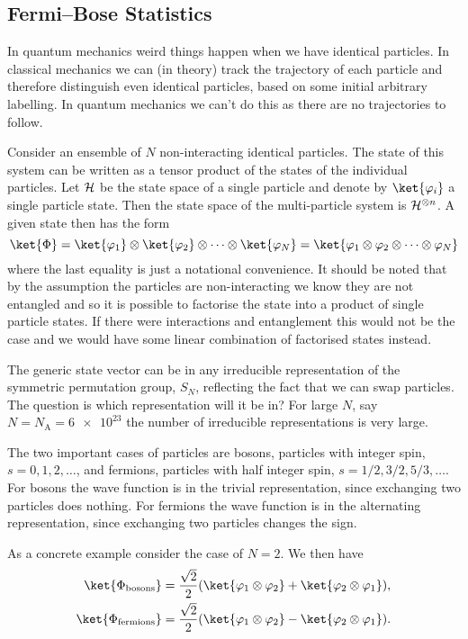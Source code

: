 \subsection{Fermi--Bose Statistics}
In quantum mechanics weird things happen when we have identical particles.
In classical mechanics we can (in theory) track the trajectory of each
particle and therefore distinguish even identical particles, based on some
initial arbitrary labelling.
In quantum mechanics we can't do this as there are no trajectories to
follow.

Consider an ensemble of \(N\) non-interacting identical particles.
The state of this system can be written as a tensor product of the states of
the individual particles.
Let \(\mathcal{H}\) be the state space of a single particle and denote by
\(\ket{\varphi_i}\) a single particle state.
Then the state space of the multi-particle system is
\(\mathcal{H}^{\otimes n}\).
A given state then has the form
\begin{equation}
    \ket{\Phi} = \ket{\varphi_1} \directproduct \ket{\varphi_2}
    \directproduct \dotsb \directproduct \ket{\varphi_N} = \ket{\varphi_1 \directproduct \varphi_2 \directproduct \dotsb \directproduct \varphi_N}
\end{equation}
where the last equality is just a notational convenience.
It should be noted that by the assumption the particles are non-interacting we know they are not entangled and so it is possible to factorise the state into a product of single particle states.
If there were interactions and entanglement this would not be the case and we would have some linear combination of factorised states instead.

The generic state vector can be in any irreducible representation of the symmetric permutation group, \(S_N\), reflecting the fact that we can swap particles.
The question is which representation will it be in?
For large \(N\), say \(N = N_{\mathrm{A}} = \num{6e23}\) the number of irreducible representations is very large.

The two important cases of particles are bosons, particles with integer spin, \(s = 0, 1, 2, \dotsc\), and fermions, particles with half integer spin, \(s = 1/2, 3/2, 5/3, \dotsc\).
For bosons the wave function is in the trivial representation, since exchanging two particles does nothing.
For fermions the wave function is in the alternating representation, since exchanging two particles changes the sign.

As a concrete example consider the case of \(N = 2\).
We then have
\begin{align}
    \ket{\Phi_{\mathrm{bosons}}} &= \frac{\sqrt{2}}{2} (\ket{\varphi_1 \directproduct \varphi_2} + \ket{\varphi_2 \directproduct \varphi_1}),\\
    \ket{\Phi_{\mathrm{fermions}}} &= \frac{\sqrt{2}}{2} (\ket{\varphi_1 \directproduct \varphi_2} - \ket{\varphi_2 \directproduct \varphi_1}).
\end{align}

